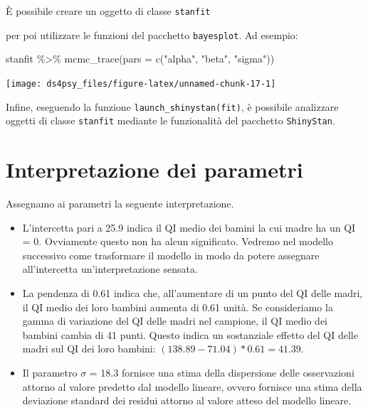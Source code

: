 \documentclass[
  11pt,
]{krantz}
\makeatletter
\newenvironment{Shaded}{\begin{snugshade}}{\end{snugshade}}
\newcommand{\AttributeTok}[1]{\textcolor[rgb]{0.61,0.61,0.61}{#1}}
\newcommand{\FunctionTok}[1]{\textcolor[rgb]{0,0,0}{#1}}
\newcommand{\NormalTok}[1]{#1}
\newcommand{\OtherTok}[1]{\textcolor[rgb]{0.37,0.37,0.37}{#1}}
\newcommand{\SpecialCharTok}[1]{\textcolor[rgb]{0,0,0}{#1}}
\newcommand{\StringTok}[1]{\textcolor[rgb]{0.5,0.5,0.5}{#1}}
\newenvironment{kframe}{%
\medskip{}
\setlength{\fboxsep}{.8em}
 \def\at@end@of@kframe{}%
 \ifinner\ifhmode%
  \def\at@end@of@kframe{\end{minipage}}%
  \begin{minipage}{\columnwidth}%
 \fi\fi%
 \def\FrameCommand##1{\hskip\@totalleftmargin \hskip-\fboxsep
 \colorbox{shadecolor}{##1}\hskip-\fboxsep
     \hskip-\linewidth \hskip-\@totalleftmargin \hskip\columnwidth}%
 \MakeFramed {\advance\hsize-\width
   \@totalleftmargin\z@ \linewidth\hsize
   \@setminipage}}%
 {\par\unskip\endMakeFramed%
 \at@end@of@kframe}
\renewenvironment{Shaded}{\begin{kframe}}{\end{kframe}}
\makeatother
\begin{document}
È possibile creare un oggetto di classe \texttt{stanfit}

\begin{Shaded}
\end{Shaded}

per poi utilizzare le funzioni del pacchetto \texttt{bayesplot}. Ad esempio:

\begin{Shaded}
\begin{Highlighting}[]
\NormalTok{stanfit }\SpecialCharTok{\%\textgreater{}\%}
  \FunctionTok{mcmc\_trace}\NormalTok{(}\AttributeTok{pars =} \FunctionTok{c}\NormalTok{(}\StringTok{"alpha"}\NormalTok{, }\StringTok{"beta"}\NormalTok{, }\StringTok{"sigma"}\NormalTok{))}
\end{Highlighting}
\end{Shaded}

\begin{center}\texttt{[image: ds4psy\_files/figure-latex/unnamed-chunk-17-1]} \end{center}

Infine, eseguendo la funzione \texttt{launch\_shinystan(fit)}, è possibile analizzare oggetti di classe \texttt{stanfit} mediante le funzionalità del pacchetto \texttt{ShinyStan}.

\hypertarget{interpretazione-dei-parametri}{%
\section{Interpretazione dei parametri}\label{interpretazione-dei-parametri}}

Assegnamo ai parametri la seguente interpretazione.

\begin{itemize}
\item
  L'intercetta pari a 25.9 indica il QI medio dei bamini la cui madre ha un QI = 0. Ovviamente questo non ha alcun significato. Vedremo nel modello successivo come trasformare il modello in modo da potere assegnare all'intercetta un'interpretazione sensata.
\item
  La pendenza di 0.61 indica che, all'aumentare di un punto del QI delle madri, il QI medio dei loro bambini aumenta di 0.61 unità. Se consideriamo la gamma di variazione del QI delle madri nel campione, il QI medio dei bambini cambia di 41 punti. Questo indica un sostanziale effetto del QI delle madri sul QI dei loro bambini: \((138.89 - 71.04) * 0.61 = 41.39\).
\item
  Il parametro \(\sigma\) = 18.3 fornisce una stima della dispersione delle osservazioni attorno al valore predetto dal modello lineare, ovvero fornisce una stima della deviazione standard dei residui attorno al valore atteso del modello lineare.
\end{itemize}
\end{document}
